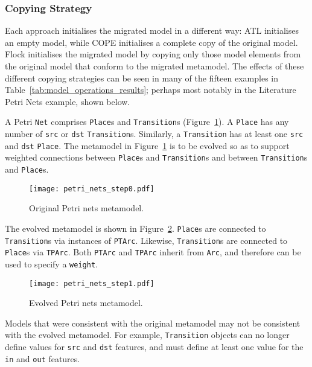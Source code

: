 \subsubsection{Copying Strategy}
Each approach initialises the migrated model in a different way: ATL initialises an empty model, while COPE initialises a complete copy of the original model. Flock initialises the migrated model by copying only those model elements from the original model that conform to the migrated metamodel. The effects of these different copying strategies can be seen in many of the fifteen examples in Table~\ref{tab:model_operations_results}; perhaps most notably in the Literature Petri Nets example, shown below.

A Petri \texttt{Net} comprises \texttt{Place}s and \texttt{Transition}s (Figure~\ref{fig:original_mm}). A \texttt{Place} has any number of \texttt{src} or \texttt{dst} \texttt{Transition}s. Similarly, a \texttt{Transition} has at least one \texttt{src} and \texttt{dst} \texttt{Place}. The metamodel in Figure~\ref{fig:original_mm} is to be evolved so as to support weighted connections between \texttt{Place}s and \texttt{Transition}s and between \texttt{Transition}s and \texttt{Place}s.

\begin{figure}[htbp]
  \centering
  \texttt{[image: petri\_nets\_step0.pdf]}
  \caption{Original Petri nets metamodel.}
  \label{fig:original_mm}
\end{figure}

The evolved metamodel is shown in Figure~\ref{fig:evolved_mm}. \texttt{Place}s are connected to \texttt{Transition}s via instances of \texttt{PTArc}. Likewise, \texttt{Transition}s are connected to \texttt{Place}s via \texttt{TPArc}. Both \texttt{PTArc} and \texttt{TPArc} inherit from \texttt{Arc}, and therefore can be used to specify a \texttt{weight}.

\begin{figure}[htbp]
  \centering
  \texttt{[image: petri\_nets\_step1.pdf]}
  \caption{Evolved Petri nets metamodel.}
  \label{fig:evolved_mm}
\end{figure}

Models that were consistent with the original metamodel may not be consistent with the evolved metamodel. For example, \texttt{Transition} objects can no longer define values for \texttt{src} and \texttt{dst} features, and must define at least one value for the \texttt{in} and \texttt{out} features.

